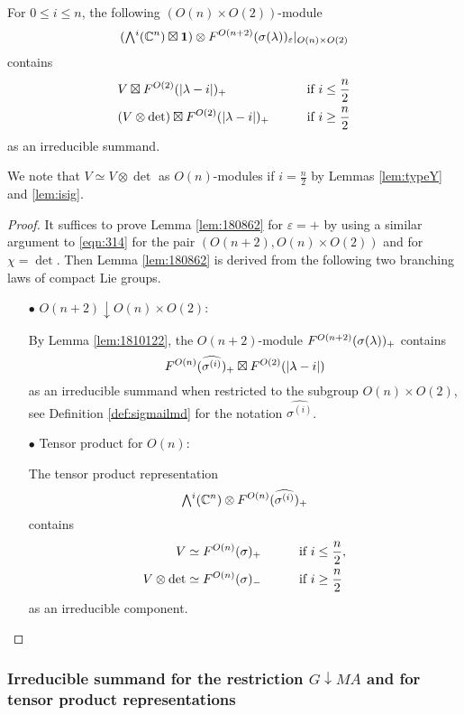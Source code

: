 \begin{lemma}
\label{lem:180862}
For $0 \le i \le n$, 
 the following $(O(n) \times O(2))$-module
\[
  (\Exterior^i({\mathbb{C}}^n) \boxtimes {\bf{1}})
  \otimes 
  \Kirredrep{O(n+2)}{\sigma(\lambda)}_{\varepsilon}|_{O(n) \times O(2)}
\]
contains
\begin{alignat*}{2}
  &V \boxtimes
  F^{{O(2)}}({|\lambda-i|})_+
\qquad
  &&\text{if $i \le \frac n 2$}
\\
  &(V \otimes \det) \boxtimes F^{{O(2)}}({|\lambda-i|})_+
\qquad
 &&\text{if $i \ge \frac n 2$}
\end{alignat*}
as an irreducible summand.  
\end{lemma}
We note that $V \simeq V \otimes \det$
 as $O(n)$-modules
 if $i=\frac n 2$
 by Lemmas \ref{lem:typeY} and \ref{lem:isig}.  
\begin{proof}
It suffices to prove Lemma \ref{lem:180862}
 for $\varepsilon =+$
 by using a similar argument
 to \eqref{eqn:314}
 for the pair $(O(n+2), O(n) \times O(2))$
 and for $\chi=\det$.  
Then Lemma \ref{lem:180862} is derived from the following two branching laws of compact Lie groups.  
\begin{enumerate}
\item[$\bullet$]
$O(n+2) \downarrow O(n) \times O(2)$:
\par
By Lemma \ref{lem:1810122}, 
 the $O(n+2)$-module $F^{{O(n+2)}}({\sigma(\lambda)})_+$ contains
\[
  F^{{O(n)}}({\widehat{\sigma^{(i)}}})_+
  \boxtimes
  F^{{O(2)}}({|\lambda-i|})
\]
as an irreducible summand
when restricted to the subgroup $O(n) \times O(2)$, 
 see Definition \ref{def:sigmailmd} for the notation $\widehat{\sigma^{(i)}}$. 
\item[$\bullet$]
Tensor product for $O(n)$:
\par
The tensor product representation
\[
  \Exterior^i({\mathbb{C}}^n) 
  \otimes 
  \Kirredrep{O(n)}{\widehat{\sigma^{(i)}}}_+
\]
contains 
\begin{alignat*}{2}
V&\simeq  F^{{O(n)}}({\sigma})_{+}
&&\text{if $i \le \frac n 2$}, 
\\
V\otimes \det &\simeq  F^{{O(n)}}({\sigma})_{-}
\qquad
&&\text{if $i \ge \frac n 2$}
\end{alignat*}
 as an irreducible component.  
\end{enumerate}
\end{proof}

\subsubsection{Irreducible summand for the restriction
 $G \downarrow M A$
 and for tensor product representations}

